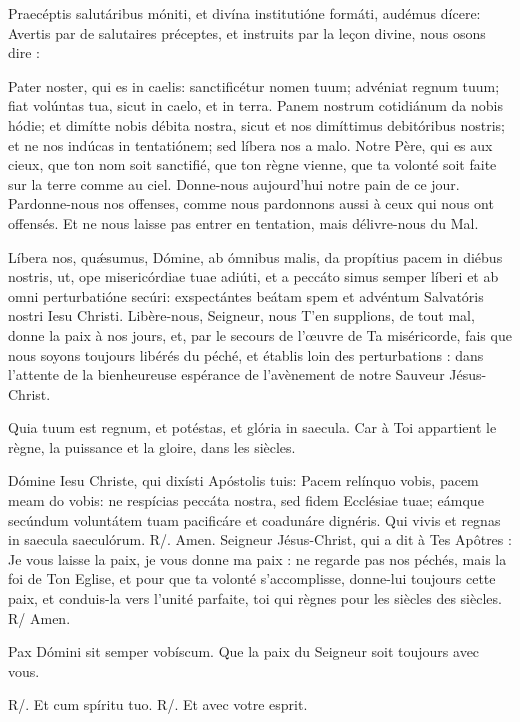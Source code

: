 \begin{paracol}{2}

\LigneParacol
{Praecéptis salutáribus móniti, et divína institutióne formáti, audémus dícere:}
{Avertis par de salutaires préceptes, et instruits par la leçon divine, nous osons dire :}

\LigneParacol
{Pater noster, qui es in caelis: sanctificétur nomen tuum; advéniat regnum tuum; fiat volúntas tua, sicut in caelo, et in terra. Panem nostrum cotidiánum da nobis hódie; et dimítte nobis débita nostra, sicut et nos dimíttimus debitóribus nostris; et ne nos indúcas in tentatiónem; sed líbera nos a malo.}
{Notre Père, qui es aux cieux, que ton nom soit sanctifié, que ton règne vienne, que ta volonté soit faite sur la terre comme au ciel. Donne-nous  aujourd’hui notre pain de ce jour. Pardonne-nous nos offenses, comme nous pardonnons aussi à ceux qui nous ont offensés. Et ne nous laisse pas entrer en tentation, mais délivre-nous du Mal.}

\LigneParacol
{Líbera nos, quǽsumus, Dómine, ab ómnibus malis, da propítius pacem in diébus nostris, ut, ope misericórdiae tuae adiúti, et a peccáto simus semper líberi et ab omni perturbatióne secúri: exspectántes beátam spem et advéntum Salvatóris nostri Iesu Christi.}
{Libère-nous, Seigneur, nous T’en supplions, de tout mal, donne la paix à nos jours, et, par le secours de l’œuvre de Ta miséricorde, fais que nous soyons toujours libérés du péché, et établis loin des perturbations : dans l’attente de la bienheureuse espérance de l’avènement de notre Sauveur Jésus-Christ.}

\LigneParacol
{Quia tuum est regnum, et potéstas, et glória in saecula.}
{Car à Toi appartient le règne, la puissance et la gloire, dans les siècles.}

\LigneParacol
{Dómine Iesu Christe, qui dixísti Apóstolis tuis: Pacem relínquo vobis, pacem meam do vobis: ne respícias peccáta nostra, sed fidem Ecclésiae tuae; eámque secúndum voluntátem tuam pacificáre et coadunáre dignéris. Qui vivis et regnas in saecula saeculórum. R/. Amen.}
{Seigneur Jésus-Christ, qui a dit à Tes Apôtres : Je vous laisse la paix, je vous donne ma paix : ne regarde pas nos péchés, mais la foi de Ton Eglise, et pour que ta volonté s’accomplisse, donne-lui toujours cette paix, et conduis-la vers l’unité parfaite, toi qui règnes pour les siècles des siècles. R/ Amen.}

\LigneParacol
{Pax Dómini sit semper vobíscum.}
{Que la paix du Seigneur soit toujours avec vous.}

\LigneParacol
{R/. Et cum spíritu tuo.}
{R/. Et avec votre esprit.}

\end{paracol}
